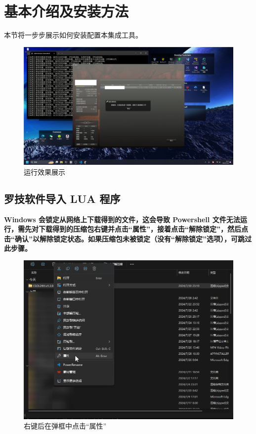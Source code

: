 \section{基本介绍及安装方法}

本节将一步步展示如何安装配置本集成工具。

\begin{figure}[H]
    \Centering
    \includegraphics[width=\textwidth]{docs/assets/controller.png}
    \caption{运行效果展示}
\end{figure}

\subsection{罗技软件导入 LUA 程序}

\textbf{\color{red}Windows 会锁定从网络上下载得到的文件，这会导致 Powershell 文件无法运行，需先对下载得到的压缩包右键并点击“属性”，接着点击“解除锁定”，然后点击“确认”以解除锁定状态。如果压缩包未被锁定（没有“解除锁定”选项），可跳过此步骤。}

\begin{figure}[H]
    \Centering
    \includegraphics[width=\textwidth]{docs/assets/unlock_00.png}
    \caption{右键后在弹框中点击“属性”}
\end{figure}

